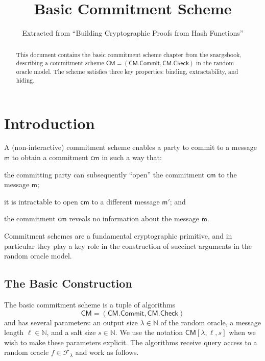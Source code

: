 \documentclass{article}
\title{Basic Commitment Scheme}
\author{Extracted from ``Building Cryptographic Proofs from Hash Functions''}
\date{}
\newcommand{\Naturals}{\mathbb{N}}
\newcommand{\ROFunction}{f}
\newcommand{\RODistribution}[1]{\mathcal{F}_{#1}}
\newcommand{\ROOutputSize}{\lambda}
\newcommand{\CMSymbol}{\mathsf{CM}}
\newcommand{\CMConstructor}[3]{\CMSymbol[#1,#2,#3]}
\newcommand{\CMCommit}{\CMSymbol.\mathsf{Commit}}
\newcommand{\CMCheck}{\CMSymbol.\mathsf{Check}}
\newcommand{\CMMessageLength}{\ell}
\newcommand{\CMSaltSize}{s}
\newcommand{\CMCommitment}{\mathsf{cm}}
\newcommand{\CMMessage}{\mathsf{m}}
\begin{document}
\maketitle

\begin{abstract}
This document contains the basic commitment scheme chapter from the snargsbook,
describing a commitment scheme $\CMSymbol = (\CMCommit, \CMCheck)$ in the random
oracle model. The scheme satisfies three key properties: binding, extractability,
and hiding.
\end{abstract}

\tableofcontents

\section{Introduction}
\label{chapter:basic-commitment}

A (non-interactive) commitment scheme enables a party to commit to a message $\CMMessage$ to obtain a commitment $\CMCommitment$ in such a way that:
\begin{inparaenum}[(a)]
  \item the committing party can subsequently ``open'' the commitment $\CMCommitment$ to the message $\CMMessage$;
  \item it is intractable to open $\CMCommitment$ to a different message $\CMMessage'$; and
  \item the commitment $\CMCommitment$ reveals no information about the message $\CMMessage$.
\end{inparaenum}
Commitment schemes are a fundamental cryptographic primitive, and in particular they play a key role in the construction of succinct arguments in the random oracle model.

\subsection{The Basic Construction}

The basic commitment scheme is a tuple of algorithms
\begin{equation*}
\CMSymbol = (\CMCommit,\CMCheck)
\end{equation*}
and has several parameters: an output size $\ROOutputSize \in \Naturals$ of the random oracle, a message length $\CMMessageLength \in \Naturals$, and a salt size $\CMSaltSize \in \Naturals$. We use the notation $\CMConstructor{\ROOutputSize}{\CMMessageLength}{\CMSaltSize}$ when we wish to make these parameters explicit. The algorithms receive query access to a random oracle $\ROFunction \in \RODistribution{\ROOutputSize}$ and work as follows.
\end{document}
